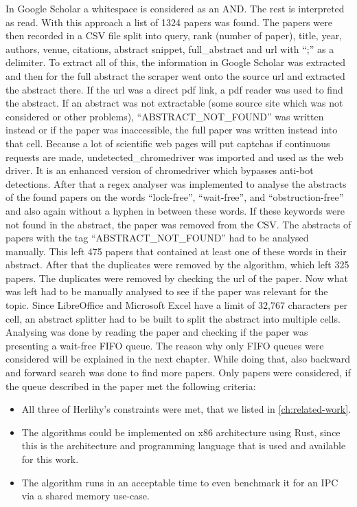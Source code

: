 In Google Scholar a whitespace is considered as an AND. The rest is interpreted as read. With this approach a list of 1324 papers was found. The papers were then recorded in a CSV file split into query, rank (number of paper), title, year, authors, venue, citations, abstract snippet, full\_abstract and url with \enquote{;} as a delimiter. To extract all of this, the information in Google Scholar was extracted and then for the full abstract the scraper went onto the source url and extracted the abstract there. If the url was a direct pdf link, a pdf reader was used to find the abstract. If an abstract was not extractable (some source site which was not considered or other problems), \enquote{ABSTRACT\_NOT\_FOUND} was written instead or if the paper was inaccessible, the full paper was written instead into that cell. Because a lot of scientific web pages will put captchas if continuous requests are made, undetected\_chromedriver was imported and used as the web driver. It is an enhanced version of chromedriver which bypasses anti-bot detections. After that a regex analyser was implemented to analyse the abstracts of the found papers on the words \enquote{lock-free}, \enquote{wait-free}, and \enquote{obstruction-free} and also again without a hyphen in between these words. If these keywords were not found in the abstract, the paper was removed from the CSV. The abstracts of papers with the tag \enquote{ABSTRACT\_NOT\_FOUND} had to be analysed manually. This left 475 papers that contained at least one of these words in their abstract. After that the duplicates were removed by the algorithm, which left 325 papers. The duplicates were removed by checking the url of the paper. Now what was left had to be manually analysed to see if the paper was relevant for the topic. Since LibreOffice and Microsoft Excel have a limit of 32,767 characters per cell, an abstract splitter had to be built to split the abstract into multiple cells. Analysing was done by reading the paper and checking if the paper was presenting a wait-free \ac{FIFO} queue. The reason why only \ac{FIFO} queues were considered will be explained in the next chapter. While doing that, also backward and forward search was done to find more papers. Only papers were considered, if the queue described in the paper met the following criteria: 
\begin{itemize}
   \item All three of Herlihy's constraints were met, that we listed in \cref{ch:related-work}.
   \item The algorithms could be implemented on x86 architecture using Rust, since this is the architecture and programming language that is used and available for this work.
   \item The algorithm runs in an acceptable time to even benchmark it for an \ac{IPC} via a shared memory use-case.
\end{itemize}
